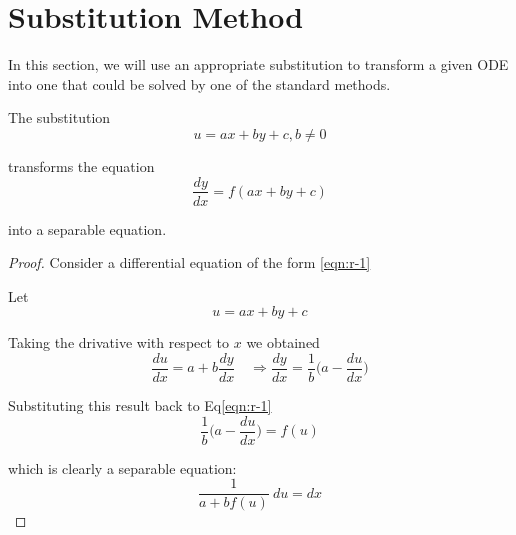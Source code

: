\section{Substitution Method}

In this section, we will use an appropriate substitution to transform a given ODE into one that could be solved by 
one of the standard methods.

\begin{theorem}
    The substitution 
    \begin{equation}
        u = ax + by + c, b\neq 0 \label{eqn:r-1}
    \end{equation}
    
    transforms the equation 
    \begin{equation}
        \frac{dy}{dx} = f(ax + by + c) \label{eqn:r-2}
    \end{equation}

    into a separable equation.
\end{theorem}

\begin{proof}
    Consider a differential equation of the form \eqref{eqn:r-1}

    Let 
    \begin{equation}
        u = ax + by + c
    \end{equation}

    Taking the drivative with respect to $x$ we obtained 
    \begin{equation}
        \frac{du}{dx} = a + b \frac{dy}{dx} \quad \Rightarrow \frac{dy}{dx} = \frac{1}{b} \biggl(a - \frac{du}{dx}\biggr)
    \end{equation}

    Substituting this result back to Eq\eqref{eqn:r-1} 
    \begin{equation}
        \frac{1}{b} \biggl(a - \frac{du}{dx}\biggr) = f(u)
    \end{equation}

    which is clearly a separable equation:
    \begin{equation}
        \frac{1}{a + bf(u)}\> du = dx
    \end{equation}
\end{proof}

